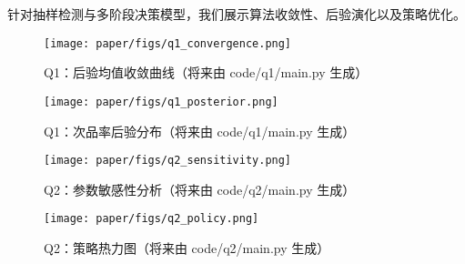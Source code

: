 针对抽样检测与多阶段决策模型，我们展示算法收敛性、后验演化以及策略优化。
\begin{figure}[htbp]\centering
  \texttt{[image: paper/figs/q1\_convergence.png]}
  \caption{Q1：后验均值收敛曲线（将来由 code/q1/main.py 生成）}
\end{figure}
\begin{figure}[htbp]\centering
  \texttt{[image: paper/figs/q1\_posterior.png]}
  \caption{Q1：次品率后验分布（将来由 code/q1/main.py 生成）}
\end{figure}
\begin{figure}[htbp]\centering
  \texttt{[image: paper/figs/q2\_sensitivity.png]}
  \caption{Q2：参数敏感性分析（将来由 code/q2/main.py 生成）}
\end{figure}
\begin{figure}[htbp]\centering
  \texttt{[image: paper/figs/q2\_policy.png]}
  \caption{Q2：策略热力图（将来由 code/q2/main.py 生成）}
\end{figure}
